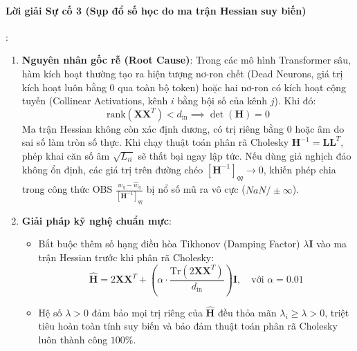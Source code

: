 \paragraph{Lời giải Sự cố 3 (Sụp đổ số học do ma trận Hessian suy biến)}:
\begin{enumerate}
  \item \textbf{Nguyên nhân gốc rễ (Root Cause)}:
  Trong các mô hình Transformer sâu, hàm kích hoạt thường tạo ra hiện tượng nơ-ron chết (Dead Neurons, giá trị kích hoạt luôn bằng 0 qua toàn bộ token) hoặc hai nơ-ron có kích hoạt cộng tuyến (Collinear Activations, kênh $i$ bằng bội số của kênh $j$). Khi đó:
  \begin{equation*}
  \text{rank}(\mathbf{X} \mathbf{X}^T) < d_{\text{in}} \implies \det(\mathbf{H}) = 0
  \end{equation*}
  Ma trận Hessian không còn xác định dương, có trị riêng bằng 0 hoặc âm do sai số làm tròn số thực. Khi chạy thuật toán phân rã Cholesky $\mathbf{H}^{-1} = \mathbf{L} \mathbf{L}^T$, phép khai căn số âm $\sqrt{L_{ii}}$ sẽ thất bại ngay lập tức. Nếu dùng giả nghịch đảo không ổn định, các giá trị trên đường chéo $[\mathbf{H}^{-1}]_{qq} \to 0$, khiến phép chia trong công thức OBS $\frac{w_q - \hat{w}_q}{[\mathbf{H}^{-1}]_{qq}}$ bị nổ số mũ ra vô cực ($NaN / \pm\infty$).
  \item \textbf{Giải pháp kỹ nghệ chuẩn mực}:
  \begin{itemize}
    \item Bắt buộc thêm số hạng điều hòa Tikhonov (Damping Factor) $\lambda \mathbf{I}$ vào ma trận Hessian trước khi phân rã Cholesky:
    \begin{equation*}
    \widehat{\mathbf{H}} = 2 \mathbf{X} \mathbf{X}^T + \left( \alpha \cdot \frac{\text{Tr}(2 \mathbf{X} \mathbf{X}^T)}{d_{\text{in}}} \right) \mathbf{I}, \quad \text{với } \alpha = 0.01
    \end{equation*}
    \item Hệ số $\lambda > 0$ đảm bảo mọi trị riêng của $\widehat{\mathbf{H}}$ đều thỏa mãn $\lambda_i \ge \lambda > 0$, triệt tiêu hoàn toàn tính suy biến và bảo đảm thuật toán phân rã Cholesky luôn thành công $100\%$.
  \end{itemize}
\end{enumerate}
